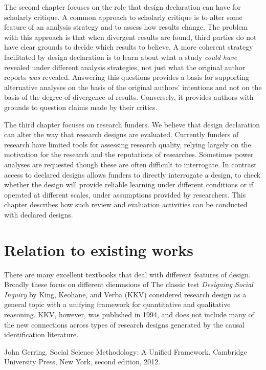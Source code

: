 \documentclass[11pt]{article}
\begin{document}
The second chapter focuses on the role that design declaration can have for scholarly critique. A common approach to scholarly critique is to alter some feature of an analysis strategy and to assess how results change. The problem with this approach is that when divergent results are found, third parties do not have clear grounds to decide which results to believe. A more coherent strategy facilitated by design declaration is to learn about what a study {\it could have} revealed under different analysis strategies, not just what the original author reports {\it was} revealed. Answering this questions provides a basis for supporting alternative analyses on the basis of the original authors' intentions and not on the basis of the degree of divergence of results. Conversely, it provides authors with grounds to question claims made by their critics. 

The third chapter focuses on research funders. We believe that design declaration can alter the way that research designs are evaluated. Currently funders of research have limited tools for assessing  research quality, relying largely on the motivation for the research and  the reputations of researches. Sometimes power analyses are requested though these are often difficult to interrogate. In contrast access to declared designs allows funders to directly interrogate a design, to check whether the design will provide reliable learning under different conditions or if operated at different scales, under assumptions provided by researchers. This chapter describes how such review and evaluation activities can be conducted with declared designs.



\section{Relation to existing works}


There are many excellent textbooks that deal with different features of design. Broadly these focus on different diemnsions of
The classic test \textit{Designing Social Inquiry} by King, Keohane, and Verba (KKV) considered research design as a general topic with a unifying framework for quantitative and qualitative reasoning. KKV, however, was published in 1994, and does not include many of the new connections across types of research designs generated by the causal identification literature.


John Gerring. Social Science Methodology: A Unified Framework. Cambridge University Press, New York, second edition, 2012.
\end{document}
